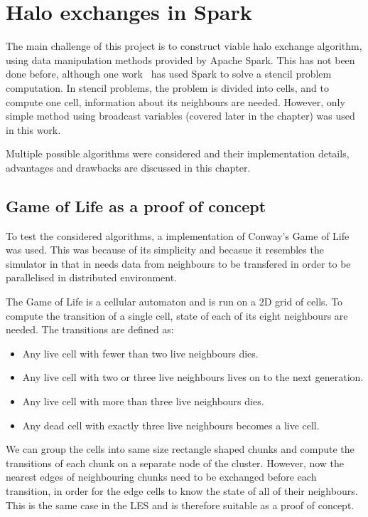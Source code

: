 \documentclass{l4proj}
\begin{document}
\chapter{Halo exchanges in Spark}
\label{chap:halos}

The main challenge of this project is to construct viable halo exchange algorithm, using 
data manipulation methods provided by Apache Spark. This has not been done before, although
one work~\cite{seismic_spark} has used Spark to solve a stencil problem computation. In stencil
problems, the problem is divided into cells, and to compute one cell, information about its
neighbours are needed. However, only simple method using broadcast variables (covered later in the chapter)
was used in this work.

Multiple possible algorithms were considered and their implementation details, advantages
and drawbacks are discussed in this chapter.

\section{Game of Life as a proof of concept}
To test the considered algorithms, a implementation of Conway's Game of Life was used.
This was because of its simplicity and becasue it resembles the simulator in that
in needs data from neighbours to be transfered in order to be parallelised in 
distributed environment.

The Game of Life is a cellular automaton and is run on a 2D grid of cells. To compute
the transition of a single cell, state of each of its eight neighbours are needed.
The transitions are defined as:

\begin{itemize} 
\item Any live cell with fewer than two live neighbours dies.
\item Any live cell with two or three live neighbours lives on to the next generation.
\item Any live cell with more than three live neighbours dies.
\item Any dead cell with exactly three live neighbours becomes a live cell.
\end{itemize}

We can group the cells into same size rectangle shaped chunks and compute the transitions of each
chunk on a separate node of the cluster. However, now the nearest edges of neighbouring
chunks need to be exchanged before each transition, in order for the edge cells to know
the state of all of their neighbours. This is the same case in the LES and is therefore
suitable as a proof of concept.
\end{document}
